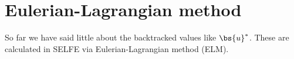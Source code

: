 \section{Eulerian-Lagrangian method}

So far we have said little about the backtracked values like $\bs{u}^*$. 
These are calculated in SELFE via Eulerian-Lagrangian method (ELM).
